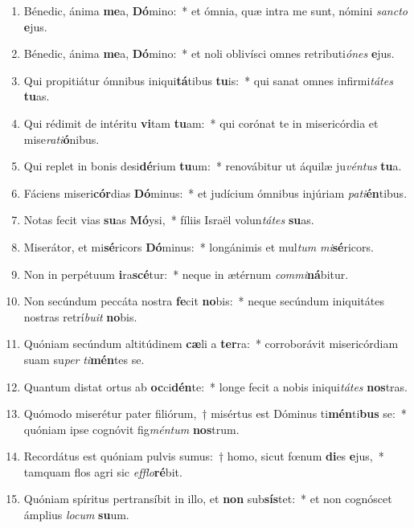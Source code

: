 \documentclass[twoside]{article}
\begin{document}
\begin{paracol}[1]{2}
\begin{enumerate}[wide, itemsep=0mm, labelwidth=!, labelindent=0pt, label=\color{gregoriocolor}\theenumi]
\item Bénedic, ánima \textbf{me}a, \textbf{Dó}mino:~* et ómnia, quæ intra me sunt, nómini \textit{sanc}\textit{to} \textbf{e}jus.
\item Bénedic, ánima \textbf{me}a, \textbf{Dó}mino:~* et noli oblivísci omnes retributi\textit{ó}\textit{nes} \textbf{e}jus.
\item Qui propitiátur ómnibus iniqui\textbf{tá}tibus \textbf{tu}is:~* qui sanat omnes infirmi\textit{tá}\textit{tes} \textbf{tu}as.
\item Qui rédimit de intéritu \textbf{vi}tam \textbf{tu}am:~* qui corónat te in misericórdia et mise\textit{ra}\textit{ti}\textbf{ó}nibus.
\item Qui replet in bonis desi\textbf{dé}rium \textbf{tu}um:~* renovábitur ut áquilæ ju\textit{vén}\textit{tus} \textbf{tu}a.
\item Fáciens miseri\textbf{cór}dias \textbf{Dó}minus:~* et judícium ómnibus injúriam \textit{pa}\textit{ti}\textbf{én}tibus.
\item Notas fecit vias \textbf{su}as \textbf{Mó}ysi,~* fíliis Israël volun\textit{tá}\textit{tes} \textbf{su}as.
\item Miserátor, et mi\textbf{sé}ricors \textbf{Dó}minus:~* longánimis et mul\textit{tum} \textit{mi}\textbf{sé}ricors.
\item Non in perpétuum \textbf{i}ra\textbf{scé}tur:~* neque in ætérnum \textit{com}\textit{mi}\textbf{ná}bitur.
\item Non secúndum peccáta nostra \textbf{fe}cit \textbf{no}bis:~* neque secúndum iniquitátes nostras retrí\textit{bu}\textit{it} \textbf{no}bis.
\item Quóniam secúndum altitúdinem \textbf{cæ}li a \textbf{ter}ra:~* corroborávit misericórdiam suam su\textit{per} \textit{ti}\textbf{mén}tes se.
\item Quantum distat ortus ab \textbf{oc}ci\textbf{dén}te:~* longe fecit a nobis iniqui\textit{tá}\textit{tes} \textbf{nos}tras.
\item Quómodo miserétur pater filiórum,~† misértus est Dóminus ti\textbf{mén}ti\textbf{bus} se:~* quóniam ipse cognóvit fig\textit{mén}\textit{tum} \textbf{nos}trum.
\item Recordátus est quóniam pulvis sumus:~† homo, sicut fœnum \textbf{di}es \textbf{e}jus,~* tamquam flos agri sic \textit{ef}\textit{flo}\textbf{ré}bit.
\item Quóniam spíritus pertransíbit in illo, et \textbf{non} sub\textbf{sís}tet:~* et non cognóscet ámplius \textit{lo}\textit{cum} \textbf{su}um.

\end{enumerate}
\end{paracol}
\end{document}
